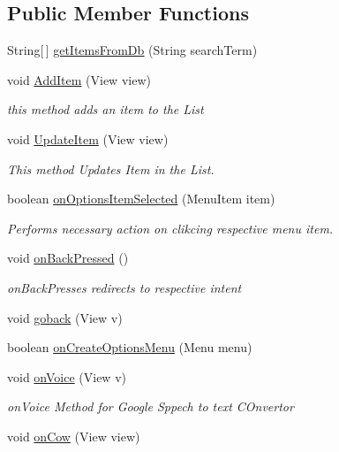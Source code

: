 \subsection*{Public Member Functions}
\begin{DoxyCompactItemize}
\item 
String\mbox{[}$\,$\mbox{]} \hyperlink{classcom_1_1example_1_1santh_1_1shoppinglist_1_1_item_activity_a2c84901261a54f907d418cc62a62bf01}{get\+Items\+From\+Db} (String search\+Term)
\item 
void \hyperlink{classcom_1_1example_1_1santh_1_1shoppinglist_1_1_item_activity_a3cee4a907695af2f1349dd36463fa232}{Add\+Item} (View view)
\begin{DoxyCompactList}\small\item\em this method adds an item to the List \end{DoxyCompactList}\item 
void \hyperlink{classcom_1_1example_1_1santh_1_1shoppinglist_1_1_item_activity_a2b50ca8d89997a96ca42966519e325d0}{Update\+Item} (View view)
\begin{DoxyCompactList}\small\item\em This method Updates Item in the List. \end{DoxyCompactList}\item 
boolean \hyperlink{classcom_1_1example_1_1santh_1_1shoppinglist_1_1_item_activity_a2292028973c391e424fe968564549bbb}{on\+Options\+Item\+Selected} (Menu\+Item item)
\begin{DoxyCompactList}\small\item\em Performs necessary action on clikcing respective menu item. \end{DoxyCompactList}\item 
void \hyperlink{classcom_1_1example_1_1santh_1_1shoppinglist_1_1_item_activity_afd0ec89a58aa62aead1e8532744900ba}{on\+Back\+Pressed} ()
\begin{DoxyCompactList}\small\item\em on\+Back\+Presses redirects to respective intent \end{DoxyCompactList}\item 
void \hyperlink{classcom_1_1example_1_1santh_1_1shoppinglist_1_1_item_activity_ad61e8de7cb10c59b8538c31a55370cd2}{goback} (View v)
\item 
boolean \hyperlink{classcom_1_1example_1_1santh_1_1shoppinglist_1_1_item_activity_aee5792c1c8583b7d0555ad2d2662f29a}{on\+Create\+Options\+Menu} (Menu menu)
\item 
void \hyperlink{classcom_1_1example_1_1santh_1_1shoppinglist_1_1_item_activity_a3073b08b8b6d85cf61e07d6087a06371}{on\+Voice} (View v)
\begin{DoxyCompactList}\small\item\em on\+Voice Method for Google Sppech to text C\+Onvertor \end{DoxyCompactList}\item 
void \hyperlink{classcom_1_1example_1_1santh_1_1shoppinglist_1_1_item_activity_a119c287029dd0cf1efb39e8d65a717b7}{on\+Cow} (View view)
\end{DoxyCompactItemize}
